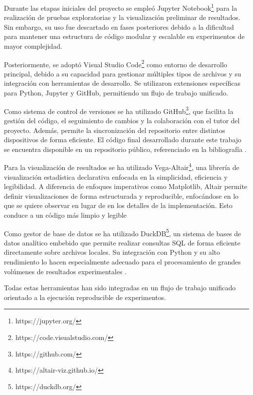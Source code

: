 Durante las etapas iniciales del proyecto se empleó Jupyter Notebook\footnote{https://jupyter.org/} para la realización de pruebas exploratorias y la visualización preliminar de resultados. Sin embargo, su uso fue descartado en fases posteriores debido a la dificultad para mantener una estructura de código modular y escalable en experimentos de mayor complejidad.

Posteriormente, se adoptó Visual Studio Code\footnote{https://code.visualstudio.com/} como entorno de desarrollo principal, debido a su capacidad para gestionar múltiples tipos de archivos y su integración con herramientas de desarrollo. Se utilizaron extensiones específicas para Python, Jupyter y GitHub, permitiendo un flujo de trabajo unificado.

Como sistema de control de versiones se ha utilizado GitHub\footnote{https://github.com/}, que facilita la gestión del código, el seguimiento de cambios y la colaboración con el tutor del proyecto. Además, permite la sincronización del repositorio entre distintos dispositivos de forma eficiente. El código final desarrollado durante este trabajo se encuentra disponible en un repositorio público, referenciado en la bibliografía \cite{eeg_DanielRosiqueEgeaEeg}.

Para la visualización de resultados se ha utilizado Vega-Altair\footnote{https://altair-viz.github.io/}, una librería de visualización estadística declarativa enfocada en la simplicidad, eficiencia y legibilidad. A diferencia de enfoques imperativos como Matplotlib, Altair permite definir visualizaciones de forma estructurada y reproducible, enfocándose en lo que se quiere observar en lugar de en los detalles de la implementación. Esto conduce a un código más limpio y legible \cite{_IntroductionAltair2025}

Como gestor de base de datos se ha utilizado DuckDB\footnote{https://duckdb.org/}, un sistema de bases de datos analítico embebido que permite realizar consultas SQL de forma eficiente directamente sobre archivos locales. Su integración con Python y su alto rendimiento lo hacen especialmente adecuado para el procesamiento de grandes volúmenes de resultados experimentales \cite{_WhyDuckDB2026}.

Todas estas herramientas han sido integradas en un flujo de trabajo unificado orientado a la ejecución reproducible de experimentos.
